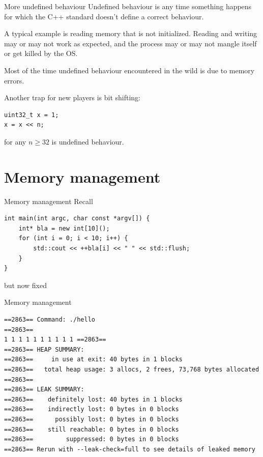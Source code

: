 \documentclass[11pt, aspectratio=169, table]{beamer}
\begin{document}
\begin{frame}[fragile]{More undefined behaviour}
\setlength\parskip{2pt}
Undefined behaviour is any time something happens for which the C++ standard doesn't define a correct behaviour.

A typical example is reading memory that is not initialized. Reading and writing may or 
may not work as expected, and the process may or may not mangle itself or get killed by the OS.

Most of the time undefined behaviour encountered in the wild is due to memory errors. 

Another trap for new players is bit shifting: 

\vspace{-0.3cm}\begin{verbatim}
uint32_t x = 1;
x = x << n;
\end{verbatim}

\vspace{-0.5cm}for any $n \geq 32$ is undefined behaviour.
\end{frame}

\section{Memory management}
\begin{frame}[fragile]{Memory management}
Recall

\begin{verbatim}
int main(int argc, char const *argv[]) {
    int* bla = new int[10]();
    for (int i = 0; i < 10; i++) {
        std::cout << ++bla[i] << " " << std::flush;
    }
}
\end{verbatim}

but now fixed
\end{frame}

\begin{frame}[fragile]{Memory management}
\vspace{-0.5cm}
\begin{verbatim}
==2863== Command: ./hello
==2863==
1 1 1 1 1 1 1 1 1 1 ==2863==
==2863== HEAP SUMMARY:
==2863==     in use at exit: 40 bytes in 1 blocks
==2863==   total heap usage: 3 allocs, 2 frees, 73,768 bytes allocated
==2863==
==2863== LEAK SUMMARY:
==2863==    definitely lost: 40 bytes in 1 blocks
==2863==    indirectly lost: 0 bytes in 0 blocks
==2863==      possibly lost: 0 bytes in 0 blocks
==2863==    still reachable: 0 bytes in 0 blocks
==2863==         suppressed: 0 bytes in 0 blocks
==2863== Rerun with --leak-check=full to see details of leaked memory
\end{verbatim}
\end{frame}
\end{document}
